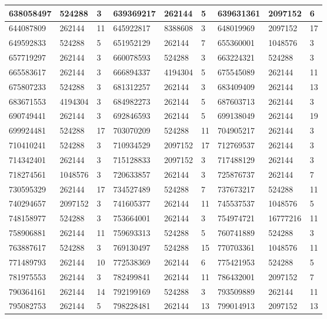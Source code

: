 \documentclass{article}
\begin{document}
\begin{longtable}{|l|l|l||l|l|l||l|l|l|}
\hline
638058497 & 524288 & 3 & 639369217 & 262144 & 5 & 639631361 & 2097152 & 6 \\
\hline
644087809 & 262144 & 11 & 645922817 & 8388608 & 3 & 648019969 & 2097152 & 17 \\
\hline
649592833 & 524288 & 5 & 651952129 & 262144 & 7 & 655360001 & 1048576 & 3 \\
\hline
657719297 & 262144 & 3 & 660078593 & 524288 & 3 & 663224321 & 524288 & 3 \\
\hline
665583617 & 262144 & 3 & 666894337 & 4194304 & 5 & 675545089 & 262144 & 11 \\
\hline
675807233 & 524288 & 3 & 681312257 & 262144 & 3 & 683409409 & 262144 & 13 \\
\hline
683671553 & 4194304 & 3 & 684982273 & 262144 & 5 & 687603713 & 262144 & 3 \\
\hline
690749441 & 262144 & 3 & 692846593 & 262144 & 5 & 699138049 & 262144 & 19 \\
\hline
699924481 & 524288 & 17 & 703070209 & 524288 & 11 & 704905217 & 262144 & 3 \\
\hline
710410241 & 524288 & 3 & 710934529 & 2097152 & 17 & 712769537 & 262144 & 3 \\
\hline
714342401 & 262144 & 3 & 715128833 & 2097152 & 3 & 717488129 & 262144 & 3 \\
\hline
718274561 & 1048576 & 3 & 720633857 & 262144 & 3 & 725876737 & 262144 & 7 \\
\hline
730595329 & 262144 & 17 & 734527489 & 524288 & 7 & 737673217 & 524288 & 11 \\
\hline
740294657 & 2097152 & 3 & 741605377 & 262144 & 11 & 745537537 & 1048576 & 5 \\
\hline
748158977 & 524288 & 3 & 753664001 & 262144 & 3 & 754974721 & 16777216 & 11 \\
\hline
758906881 & 262144 & 11 & 759693313 & 524288 & 5 & 760741889 & 524288 & 3 \\
\hline
763887617 & 524288 & 3 & 769130497 & 524288 & 15 & 770703361 & 1048576 & 11 \\
\hline
771489793 & 262144 & 10 & 772538369 & 262144 & 6 & 775421953 & 524288 & 5 \\
\hline
781975553 & 262144 & 3 & 782499841 & 262144 & 11 & 786432001 & 2097152 & 7 \\
\hline
790364161 & 262144 & 14 & 792199169 & 524288 & 3 & 793509889 & 262144 & 11 \\
\hline
795082753 & 262144 & 5 & 798228481 & 262144 & 13 & 799014913 & 2097152 & 13 \\

\end{longtable}
\end{document}
